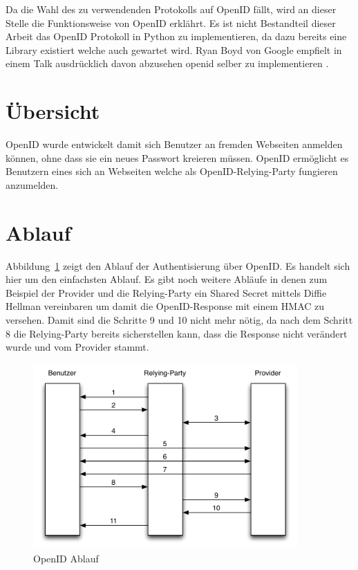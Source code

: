 Da die Wahl des zu verwendenden Protokolls auf OpenID fällt, wird an dieser Stelle die Funktionsweise von OpenID erklährt. Es ist nicht Bestandteil dieser Arbeit das OpenID Protokoll in Python zu implementieren, da dazu bereits eine Library existiert welche auch gewartet wird. Ryan Boyd von Google empfielt in einem Talk ausdrücklich davon abzusehen openid selber zu implementieren \cite[0:16:08]{googleioopenid}.

\section{Übersicht}
\label{sec:übersicht}
OpenID wurde entwickelt damit sich Benutzer an fremden Webseiten anmelden können, ohne dass sie ein neues Passwort kreieren müssen. OpenID ermöglicht es Benutzern eines  sich an Webseiten welche als \gls{OpenID-Relying-Party} fungieren anzumelden. 

\section{Ablauf}
\label{sec:ablauf}
Abbildung~\ref{fig:openid_ablauf} zeigt den Ablauf der Authentisierung über OpenID. Es handelt sich hier um den einfachsten Ablauf. Es gibt noch weitere Abläufe in denen zum Beispiel der Provider und die Relying-Party ein Shared Secret mittels Diffie Hellman\cite{rfc2631} vereinbaren um damit die OpenID-Response mit einem HMAC\cite{rfc2104} zu versehen. Damit sind die Schritte 9 und 10 nicht mehr nötig, da nach dem Schritt 8 die Relying-Party bereits sicherstellen kann, dass die Response nicht verändert wurde und vom Provider stammt.
\begin{figure}[H]
  \centering
	\includegraphics[width=0.9\textwidth]{include/openid1.pdf}
	\caption{OpenID Ablauf}
	\label{fig:openid_ablauf}
\end{figure}

